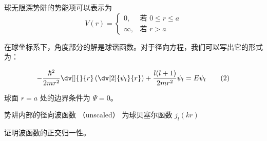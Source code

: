 
\begin{issues}
\issueDraft
\end{issues}


球无限深势阱的势能项可以表示为
$$
V(r)=
\begin{cases}
0,  & \text{若 $0\leq r\leq a$} \\
\infty, & \text{若 $r>a$}
\end{cases}\tag{1}
$$

在球坐标系下，角度部分的解是球谐函数。对于径向方程，我们可以写出它的形式为：

\begin{equation}
-\frac{\hbar^2}{2mr^2} \dv[]{}{r}\left(\dv[2]{\psi_l}{r}\right) + \frac{l(l + 1)}{2mr^2}\psi_l = E\psi_l\tag{2}
\end{equation}

球面 $r = a$ 处的边界条件为 $\Psi = 0$。

势阱内部的径向波函数 （unscaled） 为球贝塞尔函数 $j_l(kr)$

证明波函数的正交归一性。
